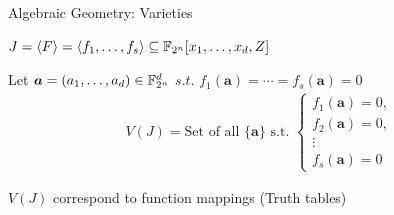 \begin{frame}{\large Algebraic Geometry: Varieties}
\bi
	\item $J = \langle F \rangle = \langle f_1, \dots, f_s \rangle \subseteq {\mathbb{F}}_{2^n}[x_1,\dots,x_d,Z] $
	\vspace{0.1in}
	\item Let $\bm{a} = (a_1,\dots,a_d) \in {\mathbb{F}}_{2^n}^d$ $s.t.$ $f_1(\bm{a}) = \cdots = f_s(\bm{a})=0$
\ei
\begin{align*}
V(J) = \text{Set of all }\{\bm{a}\} \text{ s.t. }\begin{cases}
f_1(\bm{a}) = 0, \\
f_2(\bm{a}) = 0, \\
\vdots \\
f_s(\bm{a}) = 0
\end{cases}
\end{align*}
\bi
\item $V(J)$ correspond to function mappings (Truth tables)
\ei
\end{frame}


